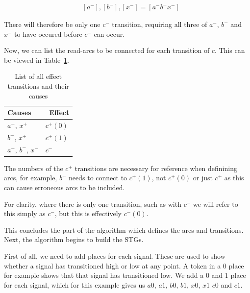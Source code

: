 \documentclass[british, journal]{IEEEtran}
\begin{document}
\vspace{-3mm}
\[
\begin{array}{lcl}
~&[a^{-}], [b^{-}], [x^{-}]  = [a^{-} b^{-} x^{-}]
\end{array}
\]

\noindent There will therefore be only one $c^{-}$ transition, requiring all three
of $a^{-}$, $b^{-}$ and $x^{-}$ to have occured before $c^{-}$
can occur. 

Now, we can list the read-arcs to be connected for each transition of $c$.
This can be viewed in Table~\ref{tab:list-by-transition}.

\begin{table}[h]
\caption{List of all effect transitions and their causes\label{tab:list-by-transition}}

  \centering
\begin{tabular}[htb]{| m{2.6cm} | m{2.0cm} |}
  \hline
Causes & \, Effect \\ \hline \hline
$a^{+}$, $x^{+}$ & $c^{+}(0)$ \\ \hline
$b^{+}$, $x^{+}$ & $c^{+}(1)$ \\ \hline
$a^{-}$, $b^{-}$, $x^{-}$ & $c^{-}$ \\ \hline
  \end{tabular}
  \vspace{-1mm}
\end{table}

The numbers of the $c^{+}$ transitions are necessary for reference
when definining arcs, for example, $b^{+}$ needs to connect to 
$c^{+}(1)$, not $c^{+}(0)$ or just $c^{+}$ as this can cause 
erroneous arcs to be included. 

For clarity, where there is only one transition, such as with $c^{-}$
we will refer to this simply as $c^{-}$, but this is effectively $c^{-}(0)$.

This concludes the part of the algorithm which defines the arcs
and transitions. Next, the algorithm begins to build the STGs. 

First of all, we need to add places for each signal. These are used to
show whether a signal has transitioned high or low at any point. 
A token in a $0$ place for example shows that that signal has 
transitioned low. We add a $0$ and $1$ place for each signal, 
which for this example gives us $a0$, $a1$, $b0$, $b1$, $x0$, $x1$
$c0$ and $c1$.

\end{document}
